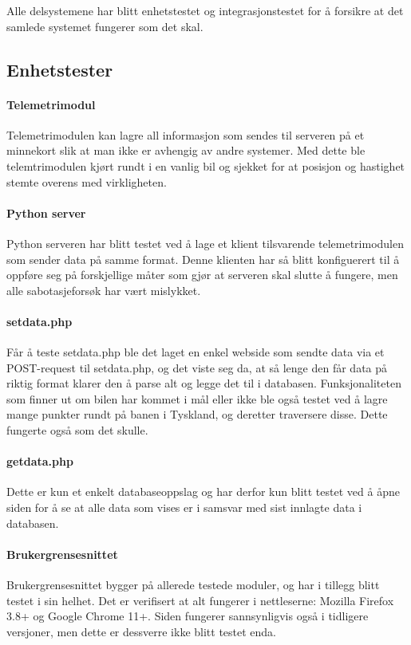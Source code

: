 Alle delsystemene har blitt enhetstestet og integrasjonstestet for å forsikre at det samlede systemet fungerer som det skal.
\subsection{Enhetstester}
\paragraph{Telemetrimodul}
Telemetrimodulen kan lagre all informasjon som sendes til serveren på et minnekort slik at man ikke er avhengig av andre systemer.
Med dette ble telemtrimodulen kjørt rundt i en vanlig bil og sjekket for at posisjon og hastighet stemte overens med virkligheten.
\paragraph{Python server}
Python serveren har blitt testet ved å lage et klient tilsvarende telemetrimodulen som sender data på samme format.
Denne klienten har så blitt konfiguerert til å oppføre seg på forskjellige måter som gjør at serveren skal slutte å fungere, men alle sabotasjeforsøk har vært mislykket.
\paragraph{setdata.php}
Får å teste setdata.php ble det laget en enkel webside som sendte data via et POST-request til setdata.php, og det viste seg da, at så lenge den får data på riktig format klarer den å parse alt og legge det til i databasen.
Funksjonaliteten som finner ut om bilen har kommet i mål eller ikke ble også testet ved å lagre mange punkter rundt på banen i Tyskland, og deretter traversere disse. Dette fungerte også som det skulle.
\paragraph{getdata.php}
Dette er kun et enkelt databaseoppslag og har derfor kun blitt testet ved å åpne siden for å se at alle data som vises er i samsvar med sist innlagte data i databasen.
\paragraph{Brukergrensesnittet}
Brukergrensesnittet bygger på allerede testede moduler, og har i tillegg blitt testet i sin helhet. Det er verifisert at alt fungerer i nettleserne: Mozilla Firefox 3.8+ og Google Chrome 11+. Siden fungerer sannsynligvis også i tidligere versjoner, men dette er dessverre ikke blitt testet enda.

